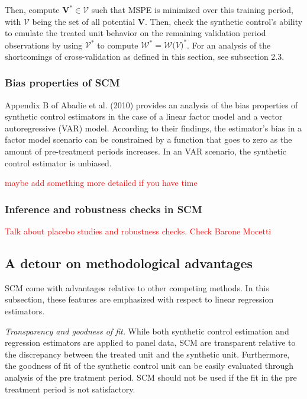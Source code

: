 \documentclass[12pt,a4paper,draft]{article}
\begin{document}
Then, compute $\mathbf{V}^* \in \mathcal{V}$ such that MSPE is minimized over this 
training period, with 
$\mathcal{V}$ being the set of all potential $\mathbf{V}$. Then, check the synthetic 
control's ability to emulate the treated unit behavior on the remaining validation 
period observations by using $\mathcal{V}^*$ to compute $\mathcal{W}^*=\mathcal{W} 
\mathcal(V)^*$.
\newline For an analysis of the shortcomings of cross-validation as defined in this 
section, see subsection 2.3.



\subsubsection{Bias properties of SCM}

Appendix B of Abadie et al. (2010) provides an analysis of the bias properties of synthetic 
control estimators in the case of a linear factor model and a vector autoregressive 
(VAR) model. According to their findings, the estimator's bias in a factor model 
scenario can be constrained by a function that goes to zero as the amount of 
pre-treatment periods increases. In an VAR scenario, the synthetic control 
estimator is unbiased.

\textcolor{red}{maybe add something more detailed if you have time} %






\subsubsection{Inference and robustness checks in SCM}
\textcolor{red}{Talk about placebo studies and robustness checks. Check Barone Mocetti} %



\subsection{A detour on methodological advantages}

SCM come with advantages relative to other competing methods. In this subsection, 
these features are emphasized with respect to linear regression estimators. 

\emph{Transparency and goodness of fit.} While both 
synthetic control estimation and regression estimators are applied to panel data, 
SCM are transparent relative to the discrepancy between the treated unit and the 
synthetic unit. Furthermore, the goodness of fit of the synthetic control unit 
can be easily evaluated through analysis of the pre tratment period. SCM should 
not be used if the fit in the pre treatment period is not satisfactory.
\end{document}

